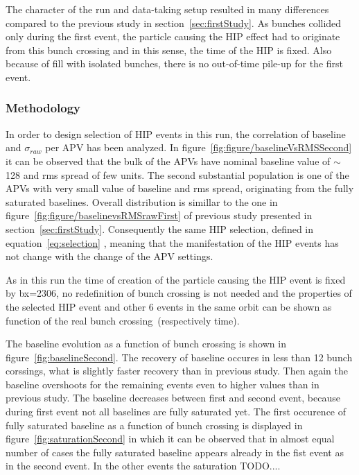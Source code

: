 
The character of the run and data-taking setup resulted in many differences compared to the previous study in section~\ref{sec:firstStudy}. As bunches collided only during the first event, the particle causing the HIP effect had to originate from this bunch crossing and in this sense, the time of the HIP is fixed. Also because of fill with isolated bunches, there is no out-of-time pile-up for the first event.

\subsubsection{Methodology}

In order to design selection of HIP events in this run, the correlation of baseline and $\sigma_{raw}$ per APV has been analyzed. In figure~\ref{fig:figure/baselineVsRMSSecond} it can be observed that the bulk of the APVs have nominal baseline value of $\sim$128 and rms spread of few units. The second substantial population is one of the APVs with very small value of baseline and rms spread, originating from the fully saturated baselines. Overall distribution is simillar to the one in figure~\ref{fig:figure/baselinevsRMSrawFirst} of previous study presented in section~\ref{sec:firstStudy}. Consequently the same HIP selection, defined in equation~\ref{eq:selection} , meaning that the manifestation of the HIP events has not change with the change of the APV settings.


As in this run the time of creation of the particle causing the HIP event is fixed by bx=2306, no redefinition of bunch crossing is not needed and the properties of the selected HIP event and other 6 events in the same orbit can be shown as function of the real bunch crossing~(respectively time).

The baseline evolution as a function of bunch crossing is shown in figure~\ref{fig:baselineSecond}. The recovery of baseline occures in less than 12 bunch corssings, what is slightly faster recovery than in previous study. Then again the baseline overshoots for the remaining events even to higher values than in previous study. The baseline decreases between first and second event, because during first event not all baselines are fully saturated yet. The first occurence of fully saturated baseline as a function of bunch crossing is displayed in figure~\ref{fig:saturationSecond} in which it can be observed that in almost equal number of cases the fully saturated baseline appears already in the fist event as in the second event. In the other events the saturation TODO....

